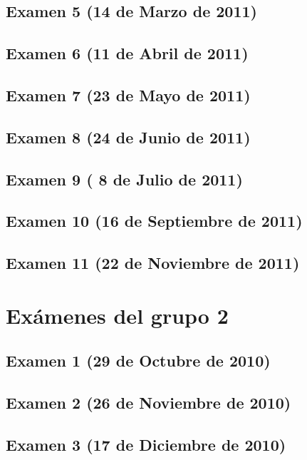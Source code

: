\documentclass[a4paper,12pt,twoside]{book}
\begin{document}
\section{Examen 5 (14 de Marzo de 2011)}
\label{examen_10_11_1_5}
\section{Examen 6 (11 de Abril de 2011)}
\section{Examen 7 (23 de Mayo de 2011)}
\section{Examen 8 (24 de Junio de 2011)} 
\label{examen_10_11_1_8}
\section{Examen 9 ( 8 de Julio de 2011)} 
\label{examen_10_11_1_9}
\section{Examen 10 (16 de Septiembre de 2011)} 
\label{examen_10_11_1_10}
\section{Examen 11 (22 de Noviembre de 2011)} 
\label{examen_10_11_1_11}

\chapter{Exámenes del grupo 2}
\section{Examen 1 (29 de Octubre de 2010)}
\section{Examen 2 (26 de Noviembre de 2010)}
\section{Examen 3 (17 de Diciembre de 2010)}
\end{document}
